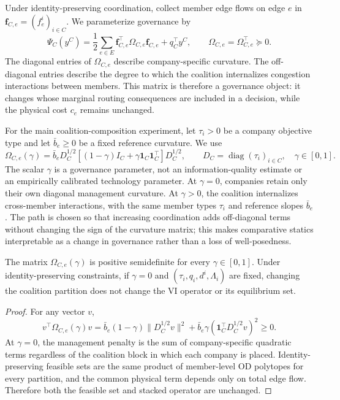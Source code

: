 Under identity-preserving coordination, collect member edge flows on edge $e$ in $\bm f_{C,e}=(f_e^i)_{i\in C}$. We parameterize governance by
\begin{equation}\label{eq:governance-matrix}
 \Psi_C(y^C)=\frac12\sum_{e\in E}\bm f_{C,e}^{\top}\Omega_{C,e}\bm f_{C,e}+q_C^\top y^C,
 \qquad \Omega_{C,e}=\Omega_{C,e}^{\top}\succeq0.
\end{equation}
The diagonal entries of $\Omega_{C,e}$ describe company-specific curvature. The off-diagonal entries describe the degree to which the coalition internalizes congestion interactions between members. This matrix is therefore a governance object: it changes whose marginal routing consequences are included in a decision, while the physical cost $c_e$ remains unchanged.

For the main coalition-composition experiment, let $\tau_i>0$ be a company objective type and let $\bar b_e\geq0$ be a fixed reference curvature. We use
\begin{equation}\label{eq:gamma-governance}
 \Omega_{C,e}(\gamma)=\bar b_eD_C^{1/2}
 \left[(1-\gamma)I_C+\gamma\mathbf1_C\mathbf1_C^\top\right]
 D_C^{1/2},
 \qquad D_C=\operatorname{diag}(\tau_i)_{i\in C},\quad \gamma\in[0,1].
\end{equation}
The scalar $\gamma$ is a governance parameter, not an information-quality estimate or an empirically calibrated technology parameter. At $\gamma=0$, companies retain only their own diagonal management curvature. At $\gamma>0$, the coalition internalizes cross-member interactions, with the same member types $\tau_i$ and reference slopes $\bar b_e$. The path is chosen so that increasing coordination adds off-diagonal terms without changing the sign of the curvature matrix; this makes comparative statics interpretable as a change in governance rather than a loss of well-posedness.

\begin{proposition}\label{prop:governance}
The matrix $\Omega_{C,e}(\gamma)$ is positive semidefinite for every $\gamma\in[0,1]$. Under identity-preserving constraints, if $\gamma=0$ and $(\tau_i,q_i,d^i,\Lambda_i)$ are fixed, changing the coalition partition does not change the VI operator or its equilibrium set.
\end{proposition}

\begin{proof}
For any vector $v$,
\[
 v^\top\Omega_{C,e}(\gamma)v
 =\bar b_e(1-\gamma)\|D_C^{1/2}v\|^2
 +\bar b_e\gamma(\mathbf1_C^\top D_C^{1/2}v)^2\geq0.
\]
At $\gamma=0$, the management penalty is the sum of company-specific quadratic terms regardless of the coalition block in which each company is placed. Identity-preserving feasible sets are the same product of member-level OD polytopes for every partition, and the common physical term depends only on total edge flow. Therefore both the feasible set and stacked operator are unchanged.
\end{proof}

